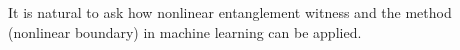 \documentclass[
reprint,
aps,
pra,
floatfix,
]{revtex4-2}
\theoremstyle{plain}
\theoremstyle{definition}
\newtheorem{remark}{Remark}
\begin{document}


It is natural to ask how nonlinear entanglement witness \cite{guhneNonlinearEntanglementWitnesses2006}  and the  method (nonlinear boundary) in machine learning can be applied. 

\end{document}
